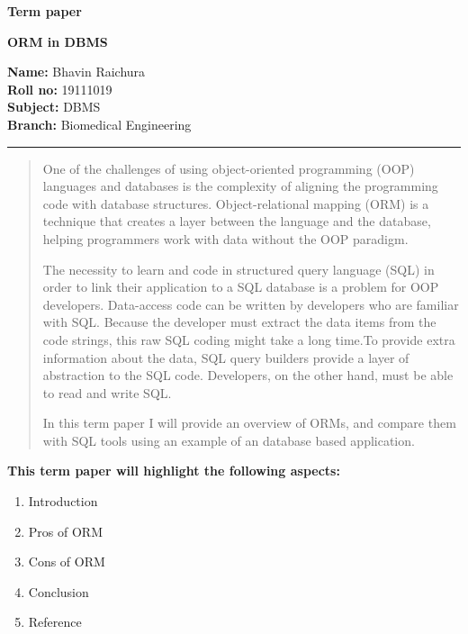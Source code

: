 \documentclass[10pt,a4paper,twoside]{article}
\begin{document}
\begin{center}
\vspace{.3cm}
{\bf {\huge Term paper}}
\item
{\bf {\huge ORM in DBMS}}
\vspace{.3cm}
\end{center}
{\bf Name:}  Bhavin Raichura\\
{\bf Roll no:}  19111019 \\
{\bf Subject:}  DBMS\\
{\bf Branch: }  Biomedical Engineering \hspace{\fill}   \\
\hrule

\vspace{.5cm}
\vspace{.4cm}

\renewcommand{\abstractname}{Abstract}

\begin{abstract}
\item One of the challenges of using object-oriented programming (OOP) languages and databases is the complexity of aligning the programming code with database structures. Object-relational mapping (ORM) is a technique that creates a layer between the language and the database, helping programmers work with data without the OOP paradigm.
\item The necessity to learn and code in structured query language (SQL) in order to link their application to a SQL database is a problem for OOP developers.
Data-access code can be written by developers who are familiar with SQL.
Because the developer must extract the data items from the code strings, this raw SQL coding might take a long time.To provide extra information about the data, SQL query builders provide a layer of abstraction to the SQL code. Developers, on the other hand, must be able to read and write SQL.
\item In this term paper I will provide an overview of ORMs, and compare them with SQL tools using an example of an database based application.
\end{abstract}

\item
\item
{\bf {\Large This term paper will highlight the following aspects:  }}\\
\begin{itemize}
\end{itemize}
\item 
\begin{enumerate}
\item Introduction
\item Pros of ORM
\item Cons of ORM
\item Conclusion
\item Reference 
\end{enumerate}
\end{document}
